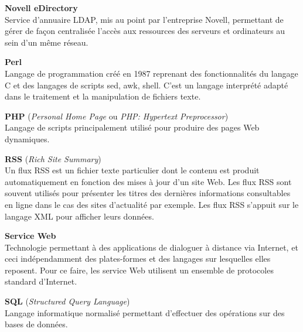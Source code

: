 \vspace{0.5cm}

\textbf{Novell eDirectory}\\
Service d'annuaire LDAP, mis au point par l'entreprise Novell, permettant de g\'erer de fa\c{c}on centralis\'ee l'acc\`es aux ressources des serveurs et ordinateurs au sein d'un m\^eme r\'eseau.

\vspace{0.5cm}

\textbf{Perl}\\
Langage de programmation cr\'e\'e en 1987 reprenant des fonctionnalit\'es du langage C et des langages de scripts sed, awk, shell.
C'est un langage interpr\'et\'e adapt\'e dans le traitement et la manipulation de fichiers texte.

\vspace{0.5cm}

\textbf{PHP} (\textit{Personal Home Page} ou \textit{PHP: Hypertext Preprocessor})\\
Langage de scripts principalement utilis\'e pour produire des pages Web dynamiques.

\vspace{0.5cm}

\textbf{RSS} (\textit{Rich Site Summary})\\
Un flux RSS est un fichier texte particulier dont le contenu est produit automatiquement en fonction des mises \`a jour d'un site Web.
Les flux RSS sont souvent utilis\'es pour pr\'esenter les titres des derni\`eres informations consultables en ligne dans le cas des sites d'actualit\'e par exemple.
Les flux RSS s'appuit sur le langage XML pour afficher leurs donn\'ees.

\vspace{0.5cm}

\textbf{Service Web}\\
Technologie permettant \`a des applications de dialoguer \`a distance via Internet, et ceci ind\'ependamment des plates-formes et des langages sur lesquelles elles reposent.
Pour ce faire, les service Web utilisent un ensemble de protocoles standard d'Internet.

\vspace{0.5cm}

\textbf{SQL} (\textit{Structured Query Language})\\
Langage informatique normalis\'e permettant d'effectuer des op\'erations sur des bases de donn\'ees.

\vspace{0.5cm}


